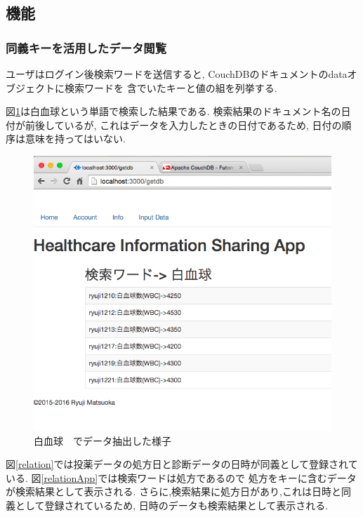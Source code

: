 \subsection{機能}
	\subsubsection{同義キーを活用したデータ閲覧}

		ユーザはログイン後検索ワードを送信すると,
		CouchDBのドキュメントのdataオブジェクトに検索ワードを
		含でいたキーと値の組を列挙する.

		図\ref{getdb}は白血球という単語で検索した結果である.
		検索結果のドキュメント名の日付が前後しているが,
		これはデータを入力したときの日付であるため,
		日付の順序は意味を持ってはいない.

			\begin{figure}[htbp]
				\begin{center}
					\includegraphics[width=15cm, bb=0 0 652 603, clip]{./gazou/getdb2.png}
				\end{center}
				\caption{白血球　でデータ抽出した様子}
				\label{getdb}
			\end{figure}


		図\ref{relation}では投薬データの処方日と診断データの日時が同義として登録されている.
		図\ref{relationApp}では検索ワードは処方であるので
		処方をキーに含むデータが検索結果として表示される.
		さらに,検索結果に処方日があり,これは日時と同義として登録されているため,
		日時のデータも検索結果として表示される.

